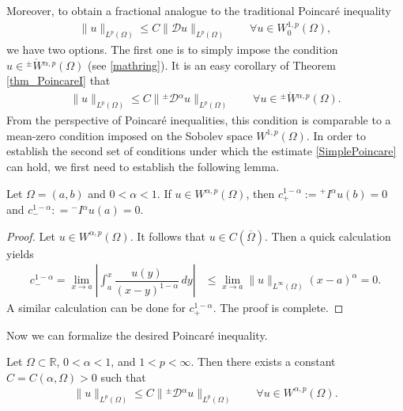 \documentclass[leqno,final]{siamltex}
\numberwithin{equation}{section}
\renewcommand{\(}{\bigl(}
\renewcommand{\)}{\bigr)}
\newcommand{\R}{\mathbb{R}}
\begin{document}
   Moreover, to obtain a fractional analogue to the traditional Poincar\'e inequality 
   \begin{align} 
   \|u \|_{L^{p}(\Omega)} \leq C \|\mathcal{D}u\|_{L^{p}(\Omega)} \qquad \forall u \in W^{1,p}_{0}(\Omega),
   \end{align}
   we have two options. The first one is to simply impose the condition $u \in {^{\pm}}{\mathring{W}}{^{\alpha,p}}(\Omega)$ (see \eqref{mathring}).
   It is an easy corollary of Theorem \ref{thm_PoincareI} that 
   \begin{align}\label{SimplePoincare}
       \|u\|_{L^{p}(\Omega)} \leq C \| {^{\pm}}{\mathcal{D}}{^{\alpha}} u \|_{L^{p}(\Omega)} \qquad \forall u \in {^{\pm}}{\mathring{W}}{^{\alpha,p}}(\Omega).
   \end{align}
   From the perspective of Poincar\'e inequalities, this condition is 
   comparable to a mean-zero condition imposed on the Sobolev space $W^{1,p}(\Omega)$. 
   In order to establish the second set of conditions under which the estimate \eqref{SimplePoincare}
   can hold, we first need to establish the following lemma.
  
   \begin{lemma}\label{NoConstants}
   Let $\Omega = (a,b)$ and $0 < \alpha <1$.
    If $u \in {W}{^{\alpha,p}}(\Omega)$, then $c^{1-\alpha}_{+} := {^{+}}{I}{^{\alpha}} u (b) = 0$ and $c^{1-\alpha}_{-} : = {^{-}}{I}{^{\alpha}} u (a) = 0$.
    \end{lemma}

\begin{proof}
    Let $u \in {W}^{\alpha,p}(\Omega)$. It follows that $u \in C(\overline{\Omega})$. Then a quick calculation yields  
    \begin{align*}
        c^{1-\alpha}_{-} =  \lim_{x \rightarrow a} \left|\int_{a}^{x} \dfrac{u(y)}{(x-y)^{1- \alpha}} \,dy \right|
        &\leq \lim_{x\rightarrow a}\|u\|_{L^{\infty}(\Omega)} (x-a)^{\alpha} 
        = 0.
    \end{align*}
    A similar calculation can be done for $c_{+}^{1-\alpha}$. The proof is complete.
\end{proof}

Now we can formalize the desired Poincar\'e inequality.

\begin{theorem}\label{SymmetricFractionalPoincare}
    Let $\Omega \subset \R$, $0 < \alpha <1$, and $1 < p < \infty$. Then there exists a constant $C = C(\alpha, \Omega)>0$ such that
    \begin{align}\label{SymmetricPoincare}
        \|u\|_{L^{p}(\Omega)} \leq C \| {^{\pm}}{\mathcal{D}}{^{\alpha}} u \|_{L^{p}(\Omega)} \qquad \forall u \in {W}^{\alpha,p}(\Omega).
    \end{align}
\end{theorem}
\end{document}
